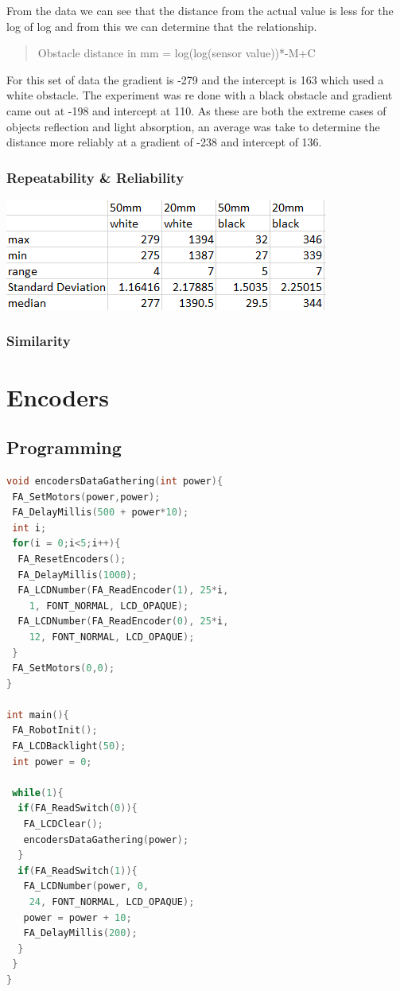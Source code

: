 \documentclass[11pt,a4paper,titlepage]{article}
\begin{document}
		From the data we can see that the distance from the actual value is less for the log of log and from this we can determine that the relationship.
		\begin{quotation}
			Obstacle distance in mm = log(log(sensor value))*-M+C
		\end{quotation}
		For this set of data the gradient is -279 and the intercept is 163 which used a white obstacle. The experiment was re done with a black obstacle and gradient came out at -198 and intercept at 110. As these are both the extreme cases of objects reflection and light absorption, an average was take to determine the distance more reliably at a gradient of -238 and intercept of 136.
	\subsubsection{Repeatability \& Reliability}
		\includegraphics[width=\textwidth,height=\textheight,keepaspectratio]{irReliablitydata}
	
	\subsubsection{Similarity}

\section{Encoders}
\subsection{Programming}
\begin{lstlisting}[language=C,frame=single]
void encodersDataGathering(int power){
 FA_SetMotors(power,power);
 FA_DelayMillis(500 + power*10);
 int i;
 for(i = 0;i<5;i++){
  FA_ResetEncoders();
  FA_DelayMillis(1000);
  FA_LCDNumber(FA_ReadEncoder(1), 25*i, 
    1, FONT_NORMAL, LCD_OPAQUE);
  FA_LCDNumber(FA_ReadEncoder(0), 25*i, 
    12, FONT_NORMAL, LCD_OPAQUE);
 }
 FA_SetMotors(0,0);
}

int main(){
 FA_RobotInit();
 FA_LCDBacklight(50);
 int power = 0;

 while(1){  
  if(FA_ReadSwitch(0)){
   FA_LCDClear();
   encodersDataGathering(power);
  }
  if(FA_ReadSwitch(1)){
   FA_LCDNumber(power, 0, 
    24, FONT_NORMAL, LCD_OPAQUE);
   power = power + 10;
   FA_DelayMillis(200);
  }
 }
}

\end{lstlisting}
\end{document}
